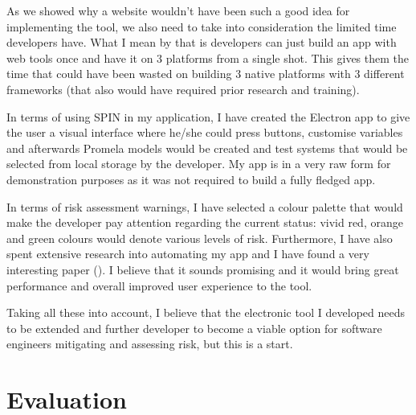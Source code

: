 \documentclass[paper=a4, fontsize=11pt]{scrartcl} %
\numberwithin{equation}{section} %
\numberwithin{figure}{section} %
\numberwithin{table}{section} %
\begin{document}
\par
As we showed why a website wouldn't have been such a good idea for implementing the tool, we also need to take into consideration the limited time developers have. What I mean by that is developers can just build an app with web tools once and have it on 3 platforms from a single shot. This gives them the time that could have been wasted on building 3 native platforms with 3 different frameworks (that also would have required prior research and training).\\

\par
In terms of using SPIN in my application, I have created the Electron app to give the user a visual interface where he/she could press buttons, customise variables and afterwards Promela models would be created and test systems that would be selected from local storage by the developer. My app is in a very raw form for demonstration purposes as it was not required to build a fully fledged app. \\

\par 
In terms of risk assessment warnings, I have selected a colour palette that would make the developer pay attention regarding the current status: vivid red, orange and green colours would denote various levels of risk. Furthermore, I have also spent extensive research into automating my app and I have found a very interesting paper (\citet{spin-uml}). I believe that it sounds promising and it would bring great performance and overall improved user experience to the tool. \\

\par 
Taking all these into account, I believe that the electronic tool I developed needs to be extended and further developer to become a viable option for software engineers mitigating and assessing risk, but this is a start. 




\section{Evaluation}
\end{document}
